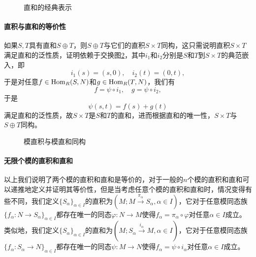 \documentclass{article}
\theoremstyle{kai-theorem}
\begin{document}
\begin{figure}[htpb]
    \centering
    \caption{直和的经典表示}
    \label{fig:classical_coproduct}
\end{figure}

\paragraph{直积与直和的等价性}
如果$ S,T $具有直和$ S\oplus T $，则$ S\oplus T $与它们的直积$ S\times T $同构，这只需说明直积$ S\times T $满足直和的泛性质，证明依赖于交换图\ref{fig:product_is_coproduct}，其中$ i_1 $和$ i_2 $分别是$ S $和$ T $到$ S\times T $的典范嵌入，即
\[
    i_1(s) = (s,0),\quad i_2(t) = (0,t),
\]
于是对任意$ f\in {\rm Hom}_R(S,N) $和$ g\in {\rm Hom}_R(T,N) $，我们有
\[
    f = \psi\circ i_1,\quad g = \psi\circ i_2,
\]
于是
\[
    \psi(s,t) = f(s) +g(t)
\]
满足直和的泛性质，故$ S\times T $是$ S $和$ T $的直和，进而根据直和的唯一性，$ S\times T $与$ S\oplus T $同构。

\begin{figure}[htpb]
    \centering
    \caption{模直积与模直和同构}
    \label{fig:product_is_coproduct}
\end{figure}

\paragraph{无限个模的直积和直和}
以上我们说明了两个模的直积和直和是等价的，对于一般的$ n $个模的直积和直和可以递推地定义并证明其等价性，但是当考虑任意个模的直积和直和时，情况变得有些不同，我们定义$ \{S_\alpha\}_{\alpha\in I} $的直积为$ (M;M\stackrel{\pi_\alpha}{\longrightarrow}S_\alpha,\alpha\in I) $，它对于任意模同态族$ \{f_\alpha:N\to S_\alpha\}_{\alpha\in I}$都存在唯一的同态$ \varphi:N\to M $使得$ f_\alpha = \pi_\alpha\circ \varphi $对任意$ \alpha\in I $成立。类似地，我们定义$ \{S_\alpha\}_{\alpha\in I} $的直和为$ (M;S_\alpha\stackrel{i_\alpha}{\longrightarrow}M,\alpha\in I) $，它对于任意模同态族$ \{f_\alpha:S_\alpha\to N\}_{\alpha\in I} $都存在唯一的同态$ \psi:M\to N $使得$ f_\alpha = \psi\circ i_\alpha $对任意$ \alpha\in I $成立。
\end{document}
